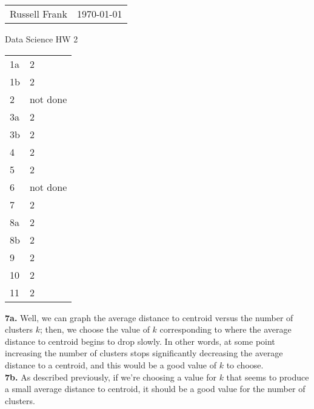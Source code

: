 \documentclass[10pt]{amsart}
\makeatletter
\newcommand{\head}[1]{
   \begin{tabular*}{7.1in}{@{}l@{\extracolsep{\fill}}r}
      Russell Frank & \today \\
   \end{tabular*}
   \begin{center} \LARGE #1 \normalsize \end{center}
   \vskip 0.1in
}
\makeatother
\begin{document}
\head{Data Science HW 2}

\begin{center}

\begin{tabular}{l|l}
  1a & 2 \\
  1b & 2 \\
  2 & not done \\
  3a & 2 \\
  3b & 2 \\
  4 & 2 \\
  5 & 2 \\
  6 & not done \\
  7 & 2 \\
  8a & 2 \\
  8b & 2 \\
  9 & 2 \\
  10 & 2 \\
  11 & 2 \\
\end{tabular}

\end{center}

\newpage

\textbf{7a.} Well, we can graph the average distance to centroid versus the 
number of clusters $k$; then, we choose the value of $k$ corresponding to 
where the average distance to centroid begins to drop slowly. In other words,
at some point increasing the number of clusters stops significantly decreasing
the average distance to a centroid, and this would be a good value of $k$ to
choose. \\

\textbf{7b.} As described previously, if we're choosing a value for $k$ that
seems to produce a small average distance to centroid, it should be a good 
value for the number of clusters. \\
\end{document}
